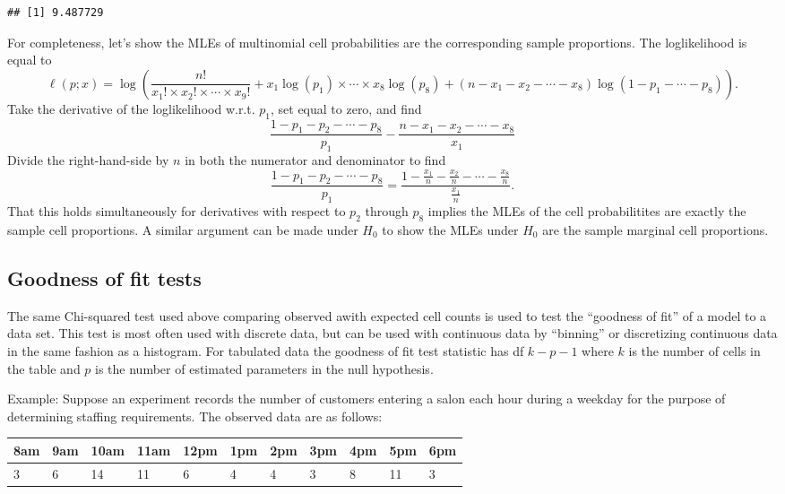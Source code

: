 \documentclass[
]{book}
\begin{document}
\begin{verbatim}
## [1] 9.487729
\end{verbatim}

For completeness, let's show the MLEs of multinomial cell probabilities are the corresponding sample proportions. The loglikelihood is equal to
\[\ell(p;x) = \log \left(\frac{n!}{x_1!\times x_2!\times \cdots\times x_9!} + x_1\log(p_1) \times \cdots \times x_8 \log(p_8) + (n-x_1-x_2-\cdots -x_8)\log(1-p_1-\cdots -p_8)\right).\]
Take the derivative of the loglikelihood w.r.t. \(p_1\), set equal to zero, and find
\[\frac{1 - p_1 - p_2 - \cdots - p_8}{p_1} - \frac{n-x_1-x_2-\cdots -x_8}{x_1}\]
Divide the right-hand-side by \(n\) in both the numerator and denominator to find
\[\frac{1 - p_1 - p_2 - \cdots - p_8}{p_1} = \frac{1-\frac{x_1}{n} - \frac{x_2}{n}-\cdots - \frac{x_8}{n}}{\frac{x_1}{n}}.\]
That this holds simultaneously for derivatives with respect to \(p_2\) through \(p_8\) implies the MLEs of the cell probabilitites are exactly the sample cell proportions. A similar argument can be made under \(H_0\) to show the MLEs under \(H_0\) are the sample marginal cell proportions.

\hypertarget{goodness-of-fit-tests}{%
\subsection{Goodness of fit tests}\label{goodness-of-fit-tests}}

The same Chi-squared test used above comparing observed awith expected cell counts is used to test the ``goodness of fit'' of a model to a data set. This test is most often used with discrete data, but can be used with continuous data by ``binning'' or discretizing continuous data in the same fashion as a histogram. For tabulated data the goodness of fit test statistic has df \(k-p-1\) where \(k\) is the number of cells in the table and \(p\) is the number of estimated parameters in the null hypothesis.

Example: Suppose an experiment records the number of customers entering a salon each hour during a weekday for the purpose of determining staffing requirements. The observed data are as follows:

\begin{longtable}[]{@{}lllllllllll@{}}
\toprule()
8am & 9am & 10am & 11am & 12pm & 1pm & 2pm & 3pm & 4pm & 5pm & 6pm \\
\midrule()
\endhead
3 & 6 & 14 & 11 & 6 & 4 & 4 & 3 & 8 & 11 & 3 \\
\bottomrule()
\end{longtable}
\end{document}
